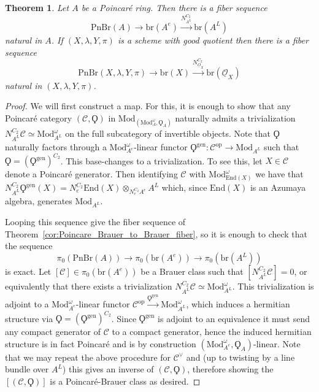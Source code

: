 \documentclass{article}
\newcommand{\op}{\mathrm{op}} %
\newcommand{\pnbr}{\ensuremath{\mathrm{PnBr}}}
\newtheorem{theorem}[equation]{Theorem}
\theoremstyle{definition}
\begin{document}
    \begin{theorem}
        Let $A$ be a Poincar{\'e} ring. Then there is a fiber sequence \[\pnbr(A)\to \mathrm{br}(A^e)\xrightarrow{N^{C_2}_{A^L}} \mathrm{br}(A^L)\] natural in $A$. If $(X,\lambda, Y,\pi)$ is a scheme with good quotient then there is a fiber sequence \[\pnbr(X,\lambda, Y,\pi)\to \mathrm{br}(X)\xrightarrow{N^{C_2}_{\underline{O}_X}} \mathrm{br}(\underline{\mathcal{O}}_X)\] natural in $(X,\lambda, Y ,\pi)$. 
    \end{theorem}
    \begin{proof}
        We will first construct a map. For this, it is enough to show that any Poincar{\'e} category $(\mathcal{C},\Qoppa)$ in $\mathrm{Mod}_{(\mathrm{Mod}_{A}^\omega, \Qoppa_A)}$ naturally admits a trivialization $N^{C_2}_{A^L}\mathcal{C}\simeq \mathrm{Mod}_{A^L}^\omega$ on the full subcategory of invertible objects. Note that $\Qoppa$ naturally factors through a $\mathrm{Mod}_{A^e}^\omega$-linear functor $\Qoppa^{\text{gen}}:\mathcal{C}^\op \to \mathrm{Mod}_{A^L}$ such that $\Qoppa = (\Qoppa^{\text{gen}})^{C_2}$. This base-changes to a trivialization. To see this, let $X\in \mathcal{C}$ denote a Poincar{\'e} generator. Then identifying $\mathcal{C}$ with $\mathrm{Mod}_{\mathrm{End}(X)}^\omega$ we have that $N^{C_2}_{A^L}\Qoppa^{\text{gen}}(X)=N^{C_2}_{e}\mathrm{End}(X)\otimes_{N_e^{C_2}A^e}A^L$ which, since $\mathrm{End}(X)$ is an Azumaya algebra, generates $\mathrm{Mod}_{A^L}$. 
        
        Looping this sequence give the fiber sequence of Theorem~\ref{cor:Poincare_Brauer_to_Brauer_fiber}, so it is enough to check that the sequence \[\pi_0(\pnbr(A))\to \pi_0(\mathrm{br}(A^e))\to \pi_0(\mathrm{br}(A^L))\] is exact. Let $[\mathcal{C}]\in \pi_0(\mathrm{br}(A^e))$ be a Brauer class such that $[N^{C_2}_{A^L}\mathcal{C}]=0$, or equivalently that there exists a trivialization $N^{C_2}_{A^L}\mathcal{C}\simeq \mathrm{Mod}_{A^L}^\omega$. This trivialization is adjoint to a $\mathrm{Mod}_{A^e}^\omega$-linear functor $\mathcal{C}^{\op}\xrightarrow{\Qoppa^{\text{gen}}}\mathrm{Mod}_{A^L}^\omega$, which induces a hermitian structure via $\Qoppa=(\Qoppa^{\text{gen}})^{C_2}$. Since $\Qoppa^{\text{gen}}$ is adjoint to an equivalence it must send any compact generator of $\mathcal{C}$ to a compact generator, hence the induced hermitian structure is in fact Poincar{\'e} and is by construction $(\mathrm{Mod}_{A^e}^\omega, \Qoppa_A)$-linear. Note that we may repeat the above procedure for $\mathcal{C}^\vee$ and (up to twisting by a line bundle over $A^L$) this gives an inverse of $(\mathcal{C},\Qoppa)$, therefore showing the $[(\mathcal{C},\Qoppa)]$ is a Poincar{\'e}-Brauer class as desired.
    \end{proof}
\end{document}
